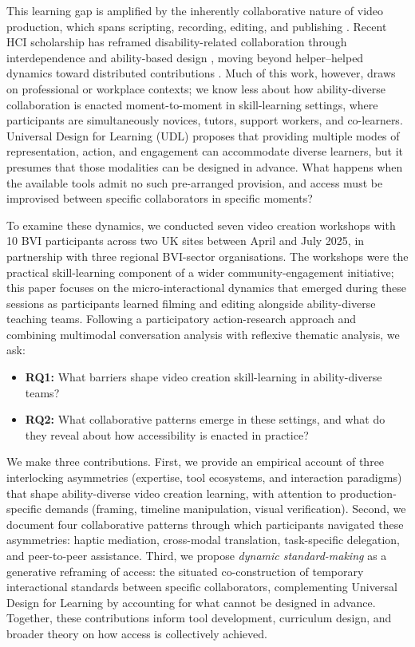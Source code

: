 This learning gap is amplified by the inherently collaborative nature of video production, which spans scripting, recording, editing, and publishing \cite{huh_avscript_2023,xiao_understanding_2025,zhang_understanding_2023}. Recent HCI scholarship has reframed disability-related collaboration through interdependence \cite{bennett_interdependence_2018} and ability-based design \cite{wobbrock_ability-based_2011}, moving beyond helper--helped dynamics toward distributed contributions \cite{xiao_systematic_2024}. Much of this work, however, draws on professional or workplace contexts; we know less about how ability-diverse collaboration is enacted moment-to-moment in skill-learning settings, where participants are simultaneously novices, tutors, support workers, and co-learners. Universal Design for Learning (UDL) \cite{rose_universal_2001,inc_udl_2024} proposes that providing multiple modes of representation, action, and engagement can accommodate diverse learners, but it presumes that those modalities can be designed in advance. What happens when the available tools admit no such pre-arranged provision, and access must be improvised between specific collaborators in specific moments?

To examine these dynamics, we conducted seven video creation workshops with 10 BVI participants across two UK sites between April and July 2025, in partnership with three regional BVI-sector organisations. The workshops were the practical skill-learning component of a wider community-engagement initiative; this paper focuses on the micro-interactional dynamics that emerged during these sessions as participants learned filming and editing alongside ability-diverse teaching teams. Following a participatory action-research approach and combining multimodal conversation analysis with reflexive thematic analysis, we ask:

\begin{itemize}
    \item \textbf{RQ1:} What barriers shape video creation skill-learning in ability-diverse teams?
    \item \textbf{RQ2:} What collaborative patterns emerge in these settings, and what do they reveal about how accessibility is enacted in practice?
\end{itemize}

We make three contributions. First, we provide an empirical account of three interlocking asymmetries (expertise, tool ecosystems, and interaction paradigms) that shape ability-diverse video creation learning, with attention to production-specific demands (framing, timeline manipulation, visual verification). Second, we document four collaborative patterns through which participants navigated these asymmetries: haptic mediation, cross-modal translation, task-specific delegation, and peer-to-peer assistance. Third, we propose \textit{dynamic standard-making} as a generative reframing of access: the situated co-construction of temporary interactional standards between specific collaborators, complementing Universal Design for Learning by accounting for what cannot be designed in advance. Together, these contributions inform tool development, curriculum design, and broader theory on how access is collectively achieved.
